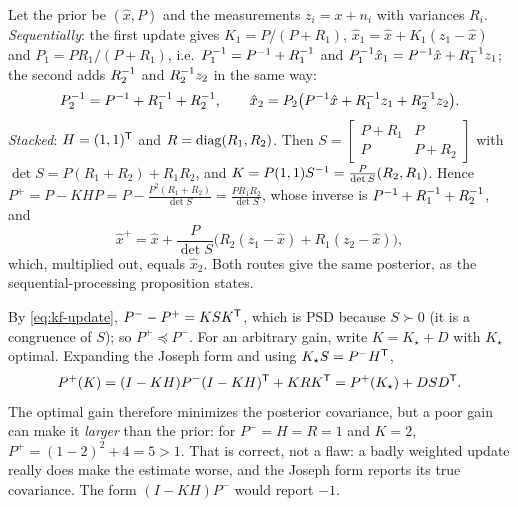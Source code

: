 \begin{solutions}
  \item Let the prior be $(\hat x, P)$ and the measurements $z_i = x + n_i$ with variances $R_i$. \emph{Sequentially}: the first update gives
        $K_1 = P/(P + R_1)$, $\hat x_1 = \hat x + K_1(z_1 - \hat x)$ and $P_1 = PR_1/(P + R_1)$, i.e.\ $P_1^{-1} = P^{-1} + R_1^{-1}$ and $P_1^{-1}\hat x_1 = P^{-1}\hat x + R_1^{-1} z_1$; the second
        adds $R_2^{-1}$ and $R_2^{-1} z_2$ in the same way:
        \[
          P_2^{-1} = P^{-1} + R_1^{-1} + R_2^{-1}, \qquad \hat x_2 = P_2\big(P^{-1}\hat x + R_1^{-1} z_1 + R_2^{-1} z_2\big).
        \]
        \emph{Stacked}: $H = (1, 1)^{\mathsf{T}}$ and $R = \operatorname{diag}(R_1, R_2)$. Then $S = \begin{bmatrix}P + R_1 & P\\ P & P + R_2\end{bmatrix}$ with $\det S = P(R_1 + R_2) + R_1R_2$, and
        $K = P(1, 1)S^{-1} = \frac{P}{\det S}(R_2, R_1)$. Hence $P^+ = P - KHP = P - \frac{P^2(R_1 + R_2)}{\det S} = \frac{PR_1R_2}{\det S}$, whose inverse is $P^{-1} + R_1^{-1} + R_2^{-1}$, and
        \[
          \hat x^+ = \hat x + \frac{P}{\det S}\big(R_2(z_1 - \hat x) + R_1(z_2 - \hat x)\big),
        \]
        which, multiplied out, equals $\hat x_2$. Both routes give the same posterior, as the sequential-processing proposition states.

  \item By \eqref{eq:kf-update}, $P^- - P^+ = KSK^{\mathsf{T}}$, which is PSD because $S \succ 0$ (it is a congruence of $S$); so $P^+ \preceq P^-$. For an arbitrary gain, write
        $K = K_\star + D$ with $K_\star$ optimal. Expanding the Joseph form and using $K_\star S = P^-H^{\mathsf{T}}$,
        \[
          P^+(K) = (I - KH)P^-(I - KH)^{\mathsf{T}} + KRK^{\mathsf{T}} = P^+(K_\star) + DSD^{\mathsf{T}} .
        \]
        The optimal gain therefore minimizes the posterior covariance, but a poor gain can make it \emph{larger} than the prior: for $P^- = H = R = 1$ and
        $K = 2$, $P^+ = (1 - 2)^2 + 4 = 5 > 1$. That is correct, not a flaw: a badly weighted update really does make the estimate worse, and the Joseph form
        reports its true covariance. The form $(I - KH)P^-$ would report $-1$.


\end{solutions}
